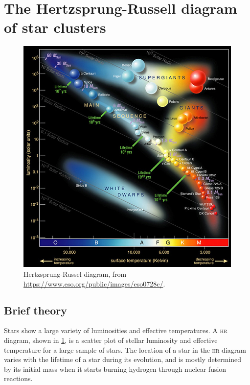 \documentclass[a4paper, 11pt, fleqn]{memoir}
\begin{document}
\section{The Hertzsprung-Russell diagram of star clusters}
\begin{figure}
    \centering
    \includegraphics[width=\linewidth]{Hertzsprung-Russel_StarData}
    \caption{Hertzsprung-Russel diagram, from \url{https://www.eso.org/public/images/eso0728c/}.}
    \label{fig:hrdiagram}
\end{figure}

\subsection{Brief theory}

Stars show a large variety of luminosities and effective temperatures.
A \textsc{hr} diagram, shown in \cref{fig:hrdiagram}, is a scatter plot of stellar luminosity and effective temperature for a large sample of stars.
The location of a star in the \textsc{hr} diagram varies with the lifetime of a star during its evolution, and is mostly determined by its initial mass when it starts burning hydrogen through nuclear fusion reactions.
\end{document}
